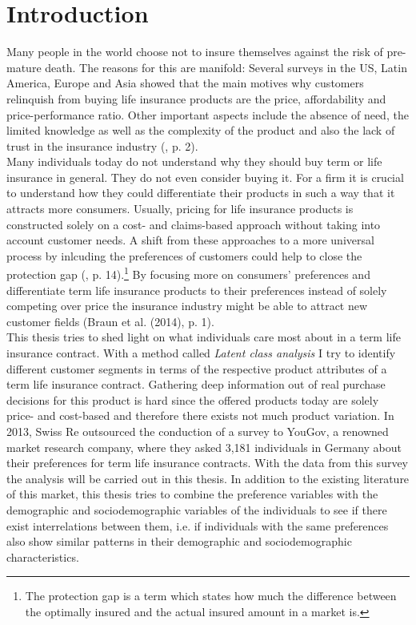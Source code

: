 \documentclass[12pt, abstracton]{article}
\begin{document}
\section{Introduction}
Many people in the world choose not to insure themselves against the risk of pre-mature death. The reasons for this are manifold: Several surveys in the US, Latin America, Europe and Asia showed that the main motives why customers relinquish from buying life insurance products are the price, affordability and price-performance ratio. Other important aspects include the absence of need, the limited knowledge as well as the complexity of the product and also the lack of trust in the insurance industry (\cite{Kirova2013}, p. 2).\\
Many individuals today do not understand why they should buy term or life insurance in general. They do not even consider buying it. For a firm it is crucial to understand how they could differentiate their products in such a way that it attracts more consumers. Usually, pricing for life insurance products is constructed solely on a cost- and claims-based approach without taking into account customer needs. A shift from these approaches to a more universal process by inlcuding the preferences of customers could help to close the protection gap (\cite{Rischatsch2016}, p. 14).\footnote{The protection gap is a term which states how much the difference between the optimally insured and the actual insured amount in a market is.} By focusing more on consumers’ preferences and differentiate term life insurance products to their preferences instead of solely competing over price the insurance industry might be able to attract new customer fields (Braun et al. (2014), p. 1).\\ 
This thesis tries to shed light on what individuals care most about in a term life insurance contract. With a method called \textit{Latent class analysis} I try to identify different customer segments in terms of the respective product attributes of a term life insurance contract. Gathering deep information out of real purchase decisions for this product is hard since the offered products today are solely price- and cost-based and therefore there exists not much product variation. In 2013, Swiss Re outsourced the conduction of a survey to YouGov, a renowned market research company, where they asked 3,181 individuals in Germany about their preferences for term life insurance contracts. With the data from this survey the analysis will be carried out in this thesis. In addition to the existing literature of this market, this thesis tries to combine the preference variables with the demographic and sociodemographic variables of the individuals to see if there exist interrelations between them, i.e. if individuals with the same preferences also show similar patterns in their demographic and sociodemographic characteristics.\\
\end{document}
